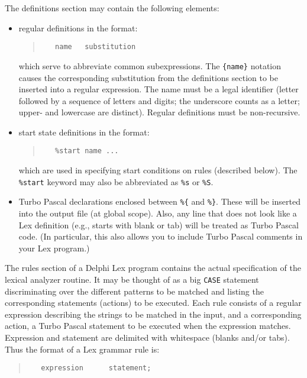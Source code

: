 \documentclass{article}
\begin{document}
The definitions section may contain the following elements:
\begin{itemize}
   \item
      regular definitions in the format:
      \begin{quote}\begin{verbatim}
   name   substitution
      \end{verbatim}\end{quote}
      which serve to abbreviate common subexpressions. The \verb"{name}"
      notation causes the corresponding substitution from the definitions
      section to be inserted into a regular expression. The name must be
      a legal identifier (letter followed by a sequence of letters and digits;
      the underscore counts as a letter; upper- and lowercase are distinct).
      Regular definitions must be non-recursive.
   \item
      start state definitions in the format:
      \begin{quote}\begin{verbatim}
   %start name ...
      \end{verbatim}\end{quote}
      which are used in specifying start conditions on rules (described
      below). The \verb"%start" keyword may also be abbreviated as \verb"%s"
      or \verb"%S".
   \item
      Turbo Pascal declarations enclosed between \verb"%{" and \verb"%}".
      These will be inserted into the output file (at global scope). Also,
      any line that does not look like a Lex definition (e.g., starts with
      blank or tab) will be treated as Turbo Pascal code. (In particular,
      this also allows you to include Turbo Pascal comments in your Lex
      program.)
\end{itemize}

The rules section of a Delphi Lex program contains the actual specification of
the lexical analyzer routine. It may be thought of as a big \verb"CASE"
statement discriminating over the different patterns to be matched and listing the
corresponding statements (actions) to be executed. Each rule consists of a
regular expression describing the strings to be matched in the input, and a
corresponding action, a Turbo Pascal statement to be executed when the
expression matches. Expression and statement are delimited with whitespace
(blanks and/or tabs). Thus the format of a Lex grammar rule is:

\begin{quote}\begin{verbatim}
   expression      statement;
\end{verbatim}\end{quote}
\end{document}
